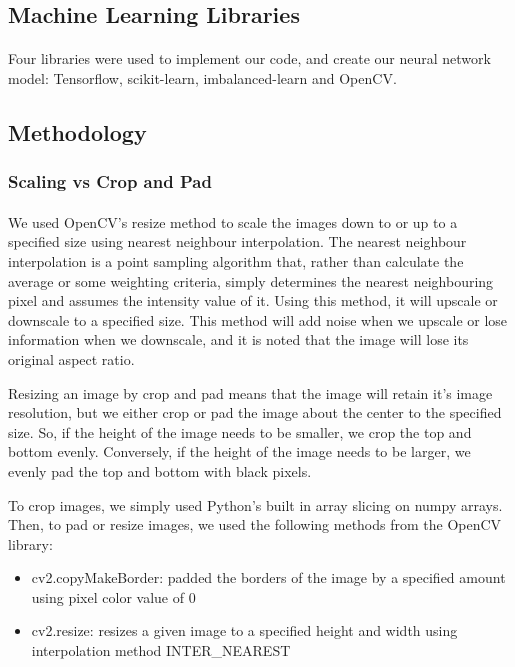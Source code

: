 \documentclass{article}
\begin{document}
\subsection{Machine Learning Libraries}
\paragraph{}
Four libraries were used to implement our code, and create our neural network model: Tensorflow, scikit-learn, imbalanced-learn and OpenCV.

\subsection{Methodology}

\subsubsection{Scaling vs Crop and Pad}
\paragraph{}
We used OpenCV's resize method to scale the images down to or up to a specified size using nearest neighbour interpolation. The nearest neighbour interpolation is a point sampling algorithm that, rather than calculate the average or some weighting criteria, simply determines the nearest neighbouring pixel and assumes the intensity value of it. Using this method, it will upscale or downscale to a specified size. This method will add noise when we upscale or lose information when we downscale, and it is noted that the image will lose its original aspect ratio.
\par
Resizing an image by crop and pad means that the image will retain it's image resolution, but we either crop or pad the image about the center to the specified size. So, if the height of the image needs to be smaller, we crop the top and bottom evenly. Conversely, if the height of the image needs to be larger, we evenly pad the top and bottom with black pixels.	

To crop images, we simply used Python's built in array slicing on numpy arrays. Then, to pad or resize images, we used the following methods from the OpenCV library:
\begin{itemize}
	\item cv2.copyMakeBorder: padded the borders of the image by a specified amount using pixel color value of 0
	\item cv2.resize: resizes a given image to a specified height and width using interpolation method INTER\_NEAREST
\end{itemize}
\end{document}
